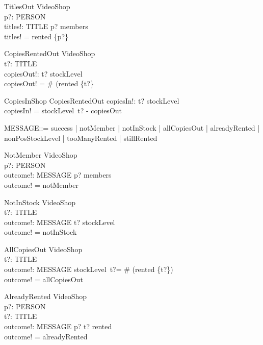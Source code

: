 \documentclass{article}
\begin{document}
\begin{schema}{TitlesOut}
\Xi VideoShop \\
p?: PERSON\\
titles!: \power TITLE
\where
p? \in members \\
titles! = rented \limg \{p?\} \rimg
\end{schema}

\begin{schema}{CopiesRentedOut}
\Xi VideoShop\\
t?: TITLE\\
copiesOut!: \nat
\where
t? \in \dom stockLevel\\
copiesOut! = \# (rented \rres \{t?\}
\end{schema}

\begin{schema}{CopiesInShop}
CopiesRentedOut
copiesIn!: \nat
\where
t? \in \dom stockLevel\\
copiesIn! = stockLevel~t? - copiesOut
\end{schema}

\begin{zed}
MESSAGE::= success | notMember | notInStock | 
allCopiesOut | alreadyRented | nonPosStockLevel | tooManyRented | stillRented
\end{zed}

\begin{schema}{NotMember}
\Xi VideoShop\\
p?: PERSON\\
outcome!: MESSAGE
\where
p? \notin members \\
outcome! = notMember
\end{schema}

\begin{schema}{NotInStock}
\Xi VideoShop\\
t?: TITLE \\
outcome!: MESSAGE
\where
t? \notin \dom stockLevel \\
outcome! = notInStock
\end{schema}

\begin{schema}{AllCopiesOut}
\Xi VideoShop\\
t?: TITLE\\
outcome!: MESSAGE
\where
stockLevel~t?= \# (rented \rres \{t?\})\\
outcome! = allCopiesOut
\end{schema}

\begin{schema}{AlreadyRented}
\Xi VideoShop \\
p?: PERSON \\
t?: TITLE \\
outcome!: MESSAGE
\where
p? \mapsto t? \in rented \\
outcome! = alreadyRented
\end{schema}
\end{document}
